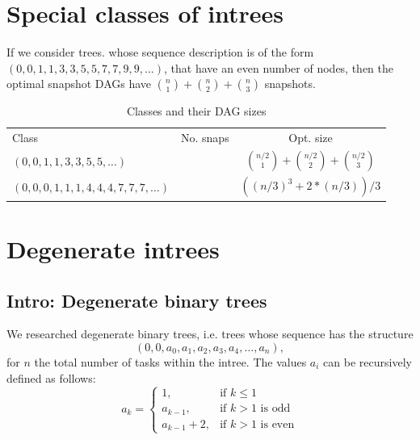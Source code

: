 \section{Special classes of intrees}
\label{sec:p3-dag-size-special-class-of-intrees}

If we consider trees. whose sequence description is of the form $(0, 0, 1, 1, 3, 3, 5, 5, 7,7, 9,9,\dots)$, that have an even number of nodes, then the optimal snapshot DAGs have $\binom{n}{1}+\binom{n}{2}+\binom{n}{3}$ snapshots. 

\begin{table}[ht]
  \centering
  \begin{tabular}{lcc}
    Class & No. snaps & Opt. size \\
    $(0,0,1,1,3,3,5,5,\dots)$ & & $\binom{n/2}{1}+\binom{n/2}{2}+\binom{n/2}{3}$ \\
    $(0,0,0,1,1,1,4,4,4,7,7,7,\dots)$ & & $((n/3)^3 + 2*(n/3))/3$
  \end{tabular}
  \caption{Classes and their DAG sizes}
  \label{tab:special-classes-dag-sizes}
\end{table}

\section{Degenerate intrees}
\label{sec:p3-degenerate-intrees}


\subsection{Intro: Degenerate binary trees}
\label{sec:p3-degenerate-trees-binary}

We researched degenerate binary trees, i.e. trees whose sequence has the structure
\begin{equation*}
  \left( 0,0,a_0,a_1,a_2,a_3,a_4,\dots,a_n \right),
\end{equation*}
for $n$ the total number of tasks within the intree. The values $a_i$ can be recursively defined as follows:
\begin{equation*}
  a_k =
  \begin{cases}
    1, & \text{if } k\leq 1 \\
    a_{k-1}, & \text{if } k>1 \text{ is odd} \\
    a_{k-1}+2, & \text{if } k>1 \text{ is even}
  \end{cases}
\end{equation*}

